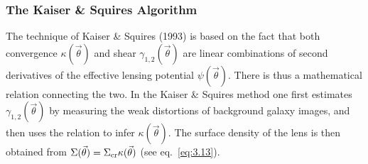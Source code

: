 \documentclass[a4paper,10pt]{article} %
\begin{document}
\subsubsection{The Kaiser \& Squires Algorithm}
\label{NB:subsubsect4.2.1}

The technique of Kaiser \& Squires (1993) is based on the fact that
both convergence $\kappa(\vec\theta)$ and shear
$\gamma_{1,2}(\vec\theta)$ are linear combinations of second
derivatives of the effective lensing potential
$\psi(\vec\theta)$. There is thus a mathematical relation connecting
the two. In the Kaiser \& Squires method one first estimates
$\gamma_{1,2} (\vec\theta)$ by measuring the weak distortions of
background galaxy images, and then uses the relation to infer
$\kappa(\vec\theta)$. The surface density of the lens is then obtained
from $\Sigma (\vec\theta)=\Sigma_{\rm cr}\kappa(\vec\theta)$ (see eq.\
\ref{eq:3.13}).
\end{document}
